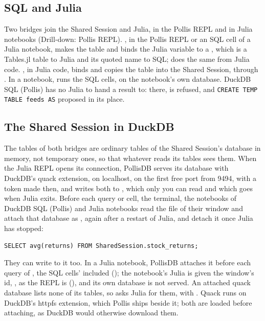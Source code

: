 \subsection{SQL and Julia}
Two bridges join the Shared Session and Julia, in the Pollis REPL and in Julia notebooks (Drill-down: Pollis REPL).
, in the Pollis REPL or an SQL cell of a Julia notebook, makes the table  and
binds the Julia variable  to a , which is a Tables.jl table to Julia and its quoted
name to SQL;  does the same from Julia code. , in Julia code, binds
 and copies the table into the Shared Session, through . In a notebook, 
runs the SQL cells, on the notebook's own database. DuckDB SQL (Pollis) has no Julia to hand a result to: there,
 is refused, and \texttt{\small CREATE TEMP TABLE feeds AS} proposed in its place.

\subsection{The Shared Session in DuckDB}\label{sec:shared-session}
The tables of both bridges are ordinary tables of the Shared Session's database in memory, not temporary ones, so that
whatever reads its tables sees them. When the Julia REPL opens its connection, PollisDB serves its database with
DuckDB's quack extension, on localhost, on the first free port from 9494, with a token made then, and writes both to
, which only you can read and which goes when Julia exits. Before
each query or cell, the  terminal, the notebooks of DuckDB SQL (Pollis) and Julia notebooks read the file
of their window and attach that database as , again after a restart of Julia, and detach it once
Julia has stopped:
\begin{lstlisting}
SELECT avg(returns) FROM SharedSession.stock_returns;
\end{lstlisting}
They can write to it too. In a Julia notebook, PollisDB attaches it before each query of , the SQL cells'
included (); the notebook's Julia is given the window's id, , as the
REPL is (), and its own database is not served. An attached quack database lists none of its tables, so  asks Julia for them,
with . Quack runs on DuckDB's httpfs extension, which Pollis ships beside it; both are loaded
before attaching, as DuckDB would otherwise download them.

